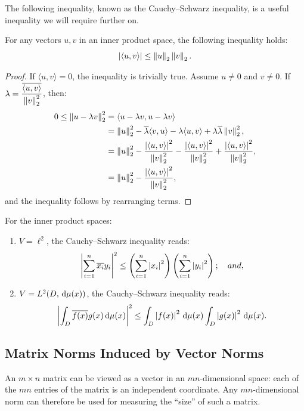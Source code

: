 The following inequality, known as the Cauchy--Schwarz inequality, is a useful inequality we will require further on.
\begin{theorem}
For any vectors $u,v$ in an inner product space, the following inequality holds:
\begin{equation}
\left|{\langle u,v\rangle}\right| \le \left\|{u}\right\|_2\left\|{v}\right\|_2.
\end{equation}
\end{theorem}
\begin{proof}
If $\langle u,v\rangle =0$, the inequality is trivially true. Assume $u\ne 0$ and $v\ne 0$. If $\lambda = \dfrac{\overline{\langle u,v\rangle}}{\left\|{v}\right\|_2^2}$, then:
\begin{align*}
0 \le \left\|{u-\lambda v}\right\|_2^2 & = \langle u-\lambda v,u-\lambda v\rangle\\
& = \left\|{u}\right\|_2^2 -\overline{\lambda}\langle v,u\rangle - \lambda\langle u,v\rangle +\lambda\overline{\lambda}\left\|{v}\right\|_2^2,\\
& = \left\|{u}\right\|_2^2 -\dfrac{\left|{\langle u,v\rangle}\right|^2}{\left\|{v}\right\|_2^2} - \dfrac{\left|{\langle u,v\rangle}\right|^2}{\left\|{v}\right\|_2^2} +\dfrac{\left|{\langle u,v\rangle}\right|^2}{\left\|{v}\right\|_2^2},\\
& = \left\|{u}\right\|_2^2 -\dfrac{\left|{\langle u,v\rangle}\right|^2}{\left\|{v}\right\|_2^2},
\end{align*}
and the inequality follows by rearranging terms.
\end{proof}

\begin{example}
For the inner product spaces:
\begin{enumerate}
\item $V=\ell^2$, the Cauchy--Schwarz inequality reads:
\[
\left|{\sum_{i=1}^n \overline{x_i}y_i}\right|^2 \le \left(\sum_{i=1}^n\left|{x_i}\right|^2\right)\left(\sum_{i=1}^n\left|{y_i}\right|^2\right);\quad and,
\]
\item $V=L^2(D,{\rm\,d}\mu(x))$, the Cauchy--Schwarz inequality reads:
\[
\left|{\int_D\overline{f(x)}g(x){\rm\,d}\mu(x)}\right|^2 \le \int_D\left|{f(x)}\right|^2{\rm\,d}\mu(x)\int_D\left|{g(x)}\right|^2{\rm\,d}\mu(x).
\]
\end{enumerate}
\end{example}

\subsection{Matrix Norms Induced by Vector Norms}

An $m\times n$ matrix can be viewed as a vector in an $mn$-dimensional space: each of the $mn$ entries of the matrix is an independent coordinate. Any $mn$-dimensional norm can therefore be used for measuring the ``size'' of such a matrix.


